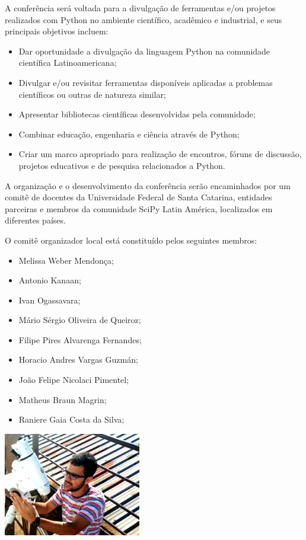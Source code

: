 \documentclass[report,a4paper,twocolumn]{memoir}
\begin{document}
A conferência será voltada para a divulgação de ferramentas e/ou projetos realizados com Python no ambiente científico, acadêmico e industrial, e seus principais objetivos incluem:
\begin{itemize}
\item Dar oportunidade a divulgação da linguagem Python na comunidade científica Latinoamericana;
\item Divulgar e/ou revisitar ferramentas disponíveis aplicadas a problemas científicos ou outras de natureza similar;
\item Apresentar bibliotecas científicas desenvolvidas pela comunidade;
\item Combinar educação, engenharia e ciência através de Python;
\item Criar um marco apropriado para realização de encontros, fóruns de discussão, projetos educativos e de pesquisa relacionados a Python.
\end{itemize}

A organização e o desenvolvimento da conferência serão encaminhados por um comitê de docentes da Universidade Federal de Santa Catarina, entidades parceiras e membros da comunidade SciPy Latin América, localizados em diferentes países. 

O comitê organizador local está constituído pelos seguintes membros:
\begin{itemize}
\item Melissa Weber Mendonça;
\item Antonio Kanaan;
\item Ivan Ogassavara;
\item Mário Sérgio Oliveira de Queiroz;
\item Filipe Pires Alvarenga Fernandes;
\item Horacio Andres Vargas Guzmán;
\item João Felipe Nicolaci Pimentel;
\item Matheus Braun Magrin;
\item Raniere Gaia Costa da Silva;
\end{itemize}

\begin{center}
\includegraphics[width=6cm]{imagens/IMG_20150521_102919-small.jpg}
\end{center}
\end{document}
